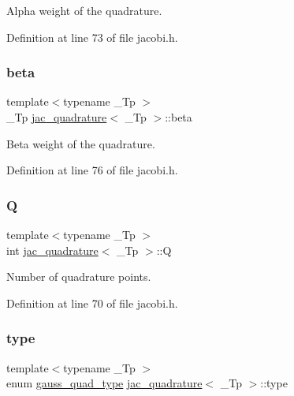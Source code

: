 Alpha weight of the quadrature. 



Definition at line 73 of file jacobi.\+h.

\mbox{\label{structjac__quadrature_ad4fd571dd4977ed96b8155c79367ac41}} 
\subsubsection{\texorpdfstring{beta}{beta}}
{\footnotesize\ttfamily template$<$typename \+\_\+\+Tp $>$ \\
\+\_\+\+Tp \hyperlink{structjac__quadrature}{jac\+\_\+quadrature}$<$ \+\_\+\+Tp $>$\+::beta}



Beta weight of the quadrature. 



Definition at line 76 of file jacobi.\+h.

\mbox{\label{structjac__quadrature_a91ae5ef05b9ea80951e40cc8a794c834}} 
\subsubsection{\texorpdfstring{Q}{Q}}
{\footnotesize\ttfamily template$<$typename \+\_\+\+Tp $>$ \\
int \hyperlink{structjac__quadrature}{jac\+\_\+quadrature}$<$ \+\_\+\+Tp $>$\+::Q}



Number of quadrature points. 



Definition at line 70 of file jacobi.\+h.

\mbox{\label{structjac__quadrature_a9af6c3334c23994de4547b9d2631ce28}} 
\subsubsection{\texorpdfstring{type}{type}}
{\footnotesize\ttfamily template$<$typename \+\_\+\+Tp $>$ \\
enum \hyperlink{jacobi_8h_a58cc26f41a96f9220797038d2d3b4c8a}{gauss\+\_\+quad\+\_\+type} \hyperlink{structjac__quadrature}{jac\+\_\+quadrature}$<$ \+\_\+\+Tp $>$\+::type}



